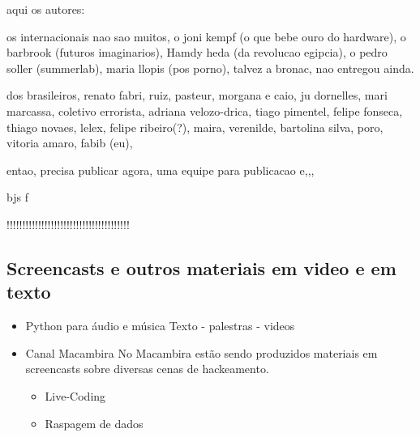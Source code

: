 \begin{itemize}
aqui os autores:

os internacionais nao sao muitos, o joni kempf (o que bebe ouro do hardware), o barbrook (futuros imaginarios),
Hamdy heda (da revolucao egipcia), o pedro soller (summerlab), maria llopis (pos porno),  talvez a bronac, nao entregou ainda.

dos brasileiros, renato fabri, ruiz, pasteur, morgana e caio, ju dornelles, mari marcassa, coletivo errorista, adriana velozo-drica, tiago pimentel, felipe fonseca, thiago novaes, lelex, felipe ribeiro(?), maira, verenilde,  bartolina silva, poro, vitoria amaro, fabib (eu),

entao, precisa publicar agora,
uma equipe para publicacao e,,, 

bjs
f

!!!!!!!!!!!!!!!!!!!!!!!!!!!!!!!!!!!!!!!

\end{itemize}

\subsection{Screencasts e outros materiais em video e em texto}

\begin{itemize}
    \item Python para áudio e música
	  Texto - palestras - videos

    \item Canal Macambira
No Macambira estão sendo produzidos materiais em screencasts sobre
diversas cenas de hackeamento.

    \begin{itemize}
	\item Live-Coding
	\item Raspagem de dados
    \end{itemize}
\end{itemize}